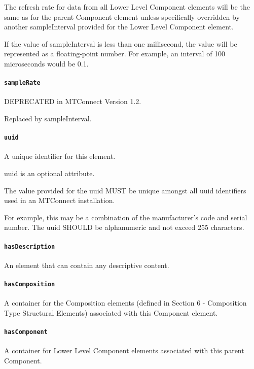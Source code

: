 The refresh rate for data from all Lower Level Component elements will be the same as for the parent Component element unless specifically overridden by another sampleInterval provided for the Lower Level Component element.

If the value of sampleInterval is less than one millisecond, the value will be represented as a floating-point number. For example, an interval of 100 microseconds would be 0.1.

\paragraph{\texttt{sampleRate}}\mbox{}
\newline\tab DEPRECATED in MTConnect Version 1.2.

Replaced by sampleInterval.

\paragraph{\texttt{uuid}}\mbox{}
\newline\tab A unique identifier for this element.

uuid is an optional attribute.

The value provided for the uuid MUST be unique amongst all uuid identifiers used in an MTConnect installation.

For example, this may be a combination of the manufacturer’s code and serial number. The uuid SHOULD be alphanumeric and not exceed 255 characters.


\paragraph{\texttt{hasDescription}}\mbox{}
\newline\tab An element that can contain any descriptive content.


\paragraph{\texttt{hasComposition}}\mbox{}
\newline\tab A container for the Composition elements (defined in Section 6 - Composition Type Structural Elements) associated with this Component element.

\paragraph{\texttt{hasComponent}}\mbox{}
\newline\tab A container for Lower Level Component elements associated with this parent Component.

